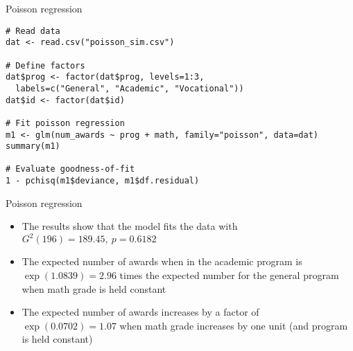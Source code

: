 \documentclass[aspectratio=169]{beamer}
\begin{document}
{

\begin{frame}[fragile]{Poisson regression}
  \begin{lstlisting}
# Read data
dat <- read.csv("poisson_sim.csv")

# Define factors
dat$prog <- factor(dat$prog, levels=1:3,
  labels=c("General", "Academic", "Vocational"))
dat$id <- factor(dat$id)

# Fit poisson regression
m1 <- glm(num_awards ~ prog + math, family="poisson", data=dat)
summary(m1)

# Evaluate goodness-of-fit
1 - pchisq(m1$deviance, m1$df.residual)
\end{lstlisting}
\end{frame}

% 
% 

}


\begin{frame}{Poisson regression}
\begin{itemize}
  \item The results show that the model fits the data with $G^2(196) =
    189.45,~p=0.6182$
  \item The expected number of awards when in the academic program is
    $\exp(1.0839) = 2.96$ times the expected number for the general program
    when math grade is held constant
  \item The expected number of awards increases by a factor of
    $\exp(0.0702) = 1.07$ when math grade increases by one unit (and
    program is held constant)
\end{itemize}
\end{frame}
\end{document}
